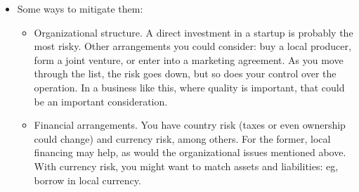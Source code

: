 \documentclass[letterpaper,12pt]{article}
\begin{document}
\begin{itemize}
\item Some ways to mitigate them:   
\begin{itemize}
\item Organizational structure.  A direct investment in a startup 
is probably the most risky.  
Other arrangements you could consider:  
buy a local producer, form a joint venture, 
or enter into a marketing agreement.  
As you move through the list, the risk goes down, 
but so does your control over the operation.  
In a business like this, where quality is important, 
that could be an important consideration.  

\item Financial arrangements.  
You have country risk (taxes or even ownership could change) 
and currency risk, among others.  
For the former, local financing may help, as would the 
organizational issues mentioned above.
With currency risk, 
you might want to match assets and liabilities:  
eg, borrow in local currency.  
\end{itemize}

\end{itemize}
\end{document}
